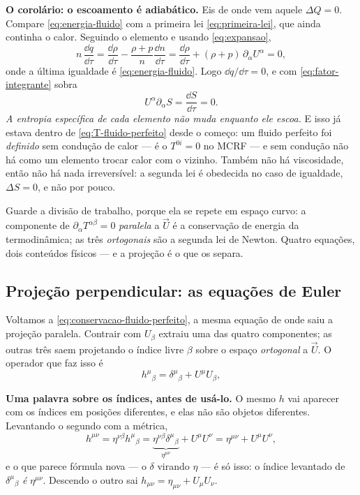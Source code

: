 \documentclass[12pt,a4paper,oneside]{book}
\theoremstyle{rgplain}
\theoremstyle{rgremark}
\begin{document}
\textbf{O corolário: o escoamento é adiabático.} Eis de onde vem aquele
$\Delta Q=0$. Compare \eqref{eq:energia-fluido} com
a primeira lei \eqref{eq:primeira-lei}, que ainda continha o calor. Seguindo o
elemento e usando \eqref{eq:expansao},
\[
  n\,\frac{\dd q}{\dd\tau}
   =\frac{\dd\rho}{\dd\tau}-\frac{\rho+p}{n}\frac{\dd n}{\dd\tau}
   =\frac{\dd\rho}{\dd\tau}+(\rho+p)\,\partial_\alpha U^\alpha
   =0 ,
\]
onde a última igualdade é \eqref{eq:energia-fluido}. Logo $\dd q/\dd\tau=0$, e
com \eqref{eq:fator-integrante} sobra
\begin{equation}
  U^\alpha\partial_\alpha S=\frac{\dd S}{\dd\tau}=0 .
  \label{eq:adiabatico}
\end{equation}
\emph{A entropia específica de cada elemento não muda enquanto ele escoa.} E
isso já estava dentro de \eqref{eq:T-fluido-perfeito} desde o começo: um
fluido perfeito foi \emph{definido} sem condução de calor --- é o
$T^{0i}=0$ no MCRF --- e sem condução não há como um elemento trocar calor com
o vizinho. Também não há viscosidade, então não há nada irreversível: a
segunda lei é obedecida no caso de igualdade, $\Delta S=0$, e não por pouco.

\begin{central}
Guarde a divisão de trabalho, porque ela se repete em espaço curvo: a
componente de $\partial_\alpha T^{\alpha\beta}=0$ \emph{paralela} a $\vec U$ é
a conservação de energia da termodinâmica; as três \emph{ortogonais} são a
segunda lei de Newton. Quatro equações, dois conteúdos físicos --- e a
projeção é o que os separa.
\end{central}

\subsection*{Projeção perpendicular: as equações de Euler}

Voltamos a \eqref{eq:conservacao-fluido-perfeito}, a mesma equação de onde
saiu a projeção paralela. Contrair com $U_\beta$ extraiu uma das quatro
componentes; as outras três saem projetando o índice livre $\beta$ sobre o
espaço \emph{ortogonal} a $\vec U$. O operador que faz isso é
\begin{equation}
  h^{\mu}{}_{\beta}=\delta^{\mu}{}_{\beta}+U^{\mu}U_{\beta} ,
  \label{eq:projetor}
\end{equation}

\textbf{Uma palavra sobre os índices, antes de usá-lo.} O mesmo $h$ vai
aparecer com os índices em posições diferentes, e elas não são objetos
diferentes. Levantando o segundo com a métrica,
\begin{equation}
  h^{\mu\nu}=\eta^{\nu\beta}h^{\mu}{}_{\beta}
   =\underbrace{\eta^{\nu\beta}\delta^{\mu}{}_{\beta}}_{\eta^{\mu\nu}}
    +U^{\mu}U^{\nu}
   =\eta^{\mu\nu}+U^{\mu}U^{\nu} ,
  \label{eq:projetor-levantado}
\end{equation}
e o que parece fórmula nova --- o $\delta$ virando $\eta$ --- é só isso: o
índice levantado de $\delta^{\mu}{}_{\beta}$ \emph{é} $\eta^{\mu\nu}$. Descendo o
outro sai $h_{\mu\nu}=\eta_{\mu\nu}+U_{\mu}U_{\nu}$.
\end{document}
